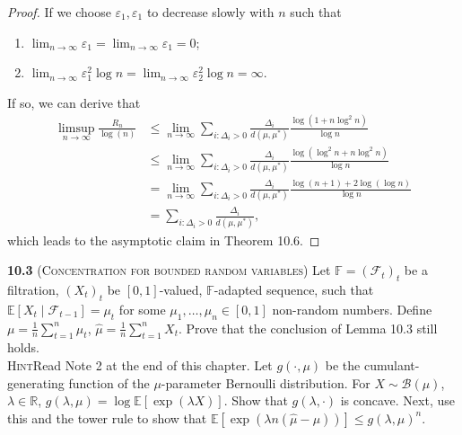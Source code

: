 \begin{proof}
    If we choose $\varepsilon_{1}, \varepsilon_{1}$ to decrease slowly with $n$ such that
    
    \begin{enumerate}
        \item $\lim_{n \to \infty} \varepsilon_{1} = \lim_{n \to \infty} \varepsilon_{1} = 0$;
        \item $\lim_{n \to \infty} \varepsilon_{1}^2 \log n = \lim_{n \to \infty} \varepsilon_{2}^2 \log n = \infty$.
    \end{enumerate}

    If so, we can derive that
    \begin{equation*}
        \begin{aligned}
            \limsup _{n \to \infty} \frac{R_{n}}{\log (n)}
            &\leq \lim _{n \to \infty} \sum_{i: \Delta_i > 0} \frac{\Delta_i}{d(\mu, \mu^*)} \frac{\log(1+n\log^2 n)}{\log n}\\
            &\leq \lim _{n \to \infty} \sum_{i: \Delta_i > 0} \frac{\Delta_i}{d(\mu, \mu^*)} \frac{\log(\log^2 n+n\log^2 n)}{\log n}\\
            &= \lim _{n \to \infty} \sum_{i: \Delta_i > 0} \frac{\Delta_i}{d(\mu, \mu^*)} \frac{\log(n+1) + 2\log(\log n)}{\log n}\\
            &= \sum_{i: \Delta_i > 0} \frac{\Delta_i}{d(\mu, \mu^*)},
        \end{aligned}
    \end{equation*}
    which leads to the asymptotic claim in Theorem 10.6.
\end{proof}

\noindent\textbf{10.3} (\textsc{Concentration for bounded random variables}) Let $\mathbb{F}=\left(\mathcal{F}_{t}\right)_{t}$ be a filtration,
$\left(X_{t}\right)_{t}$ be $[0,1]$-valued, $\mathbb{F}$-adapted sequence,
such that $\mathbb{E}\left[X_{t} \mid \mathcal{F}_{t-1}\right]=\mu_{t}$ for some $\mu_{1}, \ldots, \mu_{n} \in[0,1]$ non-random numbers.
Define $\mu=\frac{1}{n} \sum_{t=1}^{n} \mu_{t}$, $\hat{\mu}=\frac{1}{n} \sum_{t=1}^{n} X_{t}$.
Prove that the conclusion of Lemma 10.3 still holds.
~\\
\noindent\textsc{Hint}\quad Read Note 2 at the end of this chapter.
Let $g(\cdot, \mu)$ be the cumulant-generating function of the $\mu$-parameter Bernoulli distribution.
For $X \sim \mathcal{B}(\mu)$, $\lambda \in \mathbb{R}$, $g(\lambda, \mu)=\log \mathbb{E}[\exp (\lambda X)]$.
Show that $g(\lambda, \cdot)$ is concave.
Next, use this and the tower rule to show that $\mathbb{E}[\exp (\lambda n(\hat{\mu}-\mu))] \leq g(\lambda, \mu)^{n}$.


